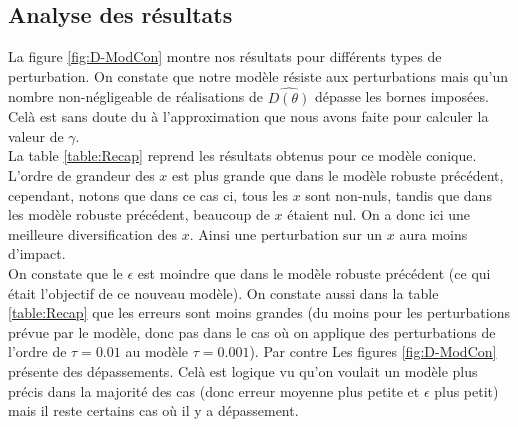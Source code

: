 \subsection{Analyse des résultats}
La figure \ref{fig:D-ModCon} montre nos résultats pour différents types de perturbation. On constate que notre modèle résiste aux perturbations mais qu'un nombre non-négligeable de réalisations de $\hat{D(\theta)}$ dépasse les bornes imposées. Celà est sans doute du à l'approximation que nous avons faite pour calculer la valeur de $\gamma$.\\
La table \ref{table:Recap} reprend les résultats obtenus pour ce modèle conique. L'ordre de grandeur des $x$ est plus grande que dans le modèle robuste précédent, cependant, notons que dans ce cas ci, tous les $x$ sont non-nuls, tandis que dans les modèle robuste précédent, beaucoup de $x$ étaient nul. On a donc ici une meilleure diversification des $x$. Ainsi une perturbation sur un $x$ aura moins d'impact. \\
On constate que le $\epsilon$ est moindre que dans le modèle robuste précédent (ce qui était l'objectif de ce nouveau modèle). On constate aussi dans la table \ref{table:Recap} que les erreurs sont moins grandes (du moins pour les perturbations prévue par le modèle, donc pas dans le cas où on applique des perturbations de l'ordre de $\tau=0.01$ au modèle $\tau=0.001$). Par contre Les figures \ref{fig:D-ModCon} présente des dépassements. Celà est logique vu qu'on voulait un modèle plus précis dans la majorité des cas (donc erreur moyenne plus petite et $\epsilon$ plus petit) mais il reste certains cas où il y a dépassement.
